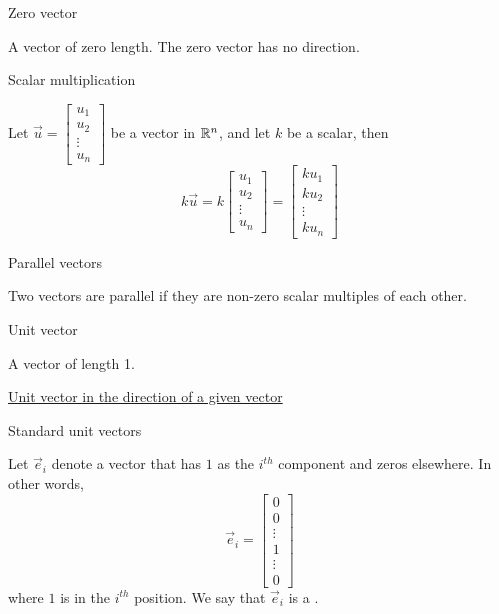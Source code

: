 \documentclass{ximera}
\begin{document}
Zero vector
\begin{expandable}
    A vector of zero length.  The zero vector has no direction.
\end{expandable}

Scalar multiplication 
\begin{expandable}
    Let $\vec{u}=\begin{bmatrix}
u_1\\
u_2\\
\vdots\\
u_n
\end{bmatrix}$ be a vector in $\mathbb{R}^n$, and let $k$ be a scalar, then
  $$k\vec{u}=k\begin{bmatrix}
u_1\\
u_2\\
\vdots\\
u_n
\end{bmatrix}=\begin{bmatrix}
ku_1\\
ku_2\\
\vdots\\
ku_n
\end{bmatrix}$$
\end{expandable}

Parallel vectors
\begin{expandable}
    Two vectors are parallel if they are non-zero scalar multiples of each other.
\end{expandable}

Unit vector
\begin{expandable}
    A vector of length 1.
\end{expandable}

\href{https://ximera.osu.edu/oerlinalg/LinearAlgebra/VEC-0036/main}{Unit vector in the direction of a given vector}

Standard unit vectors
\begin{expandable}
  Let $\vec{e}_i$ denote a vector that has $1$ as the $i^{th}$ component and zeros elsewhere.  In other words, $$\vec{e}_i=\begin{bmatrix}
0\\
0\\
\vdots\\
1\\
\vdots\\
0
\end{bmatrix}$$ 
  where $1$ is in the $i^{th}$ position.  We say that  $\vec{e}_i$ is a .
\end{expandable}
\end{document}
